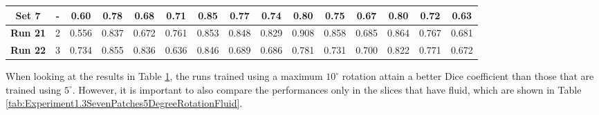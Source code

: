 \begin{table}[!ht]
{\begin{tabular}{|c|c|ccc|ccc|ccc|c|c|c|c|}
		\hline
		
		\textbf{Set 7} & - & \multicolumn{1}{c|}{0.60} & \multicolumn{1}{c|}{0.78} & 0.68 & \multicolumn{1}{c|}{0.71} & \multicolumn{1}{c|}{0.85} & 0.77 & \multicolumn{1}{c|}{0.74} & \multicolumn{1}{c|}{0.80} & 0.75 & 0.67 & 0.80 & 0.72 & 0.63 \\
		
		\hline
		\hline
		
		\textbf{Run 21} & 2 & \multicolumn{1}{c|}{0.556} & \multicolumn{1}{c|}{0.837} & 0.672 & \multicolumn{1}{c|}{0.761} & \multicolumn{1}{c|}{0.853} & 0.848 & \multicolumn{1}{c|}{0.829} & \multicolumn{1}{c|}{0.908} & 0.858 & 0.685 & 0.864 & 0.767 & 0.681 \\

		\textbf{Run 22} & 3 & \multicolumn{1}{c|}{0.734} & \multicolumn{1}{c|}{0.855} & 0.836 & \multicolumn{1}{c|}{0.636} & \multicolumn{1}{c|}{0.846} & 0.689 & \multicolumn{1}{c|}{0.686} & \multicolumn{1}{c|}{0.781} & 0.731 & 0.700 & 0.822 & 0.771 & 0.672 \\

		\hline
			
	\end{tabular}}
	\label{tab:Experiment1.3SevenPatches5DegreeRotation}
\end{table}

When looking at the results in Table \ref{tab:Experiment1.3SevenPatches5DegreeRotation}, the runs trained using a maximum $10^{\circ}$ rotation attain a better Dice coefficient than those that are trained using $5^{\circ}$. However, it is important to also compare the performances only in the slices that have fluid, which are shown in Table \ref{tab:Experiment1.3SevenPatches5DegreeRotationFluid}.

